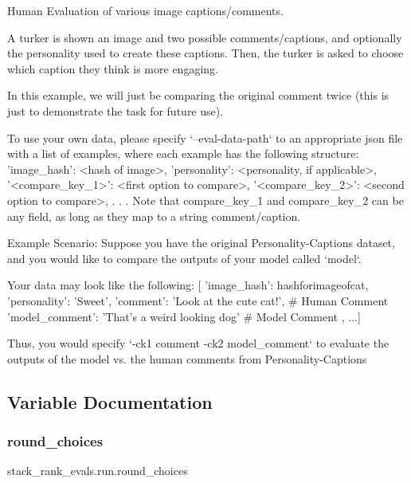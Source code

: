 \begin{DoxyVerb}Human Evaluation of various image captions/comments.

A turker is shown an image and two possible comments/captions, and
optionally the personality used to create these captions. Then, the
turker is asked to choose which caption they think is more engaging.

In this example, we will just be comparing the original comment twice
(this is just to demonstrate the task for future use).

To use your own data, please specify `--eval-data-path` to an
appropriate json file with a list of examples, where each example
has the following structure:
    {
        'image_hash': <hash of image>,
        'personality': <personality, if applicable>,
        '<compare_key_1>': <first option to compare>,
        '<compare_key_2>': <second option to compare>,
        .
        .
        .
    }
Note that compare_key_1 and compare_key_2 can be any field, as long as they
map to a string comment/caption.

Example Scenario:
    Suppose you have the original Personality-Captions dataset, and
    you would like to compare the outputs of your model called `model`.

    Your data may look like the following:
    [{
        'image_hash': hashforimageofcat,
        'personality': 'Sweet',
        'comment': 'Look at the cute cat!', # Human Comment
        'model_comment': 'That's a weird looking dog' # Model Comment
    }, ...]

    Thus, you would specify `-ck1 comment -ck2 model_comment` to evaluate
    the outputs of the model vs. the human comments from Personality-Captions
\end{DoxyVerb}
 

\subsection{Variable Documentation}
\mbox{\label{namespacestack__rank__evals_1_1run_a7da608ae54872ed1fb55c4c87600cf99}} 
\subsubsection{\texorpdfstring{round\+\_\+choices}{round\_choices}}
{\footnotesize\ttfamily stack\+\_\+rank\+\_\+evals.\+run.\+round\+\_\+choices}

